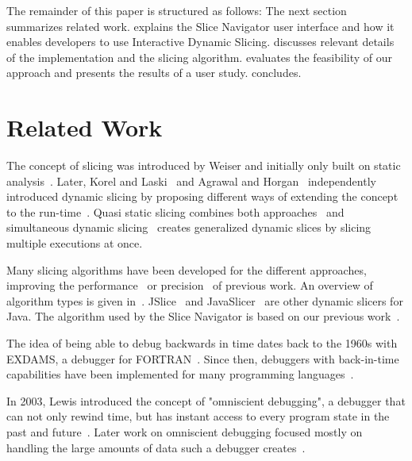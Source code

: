 \documentclass[
			english,
			review,
			]{elsarticle}
\begin{document}
The remainder of this paper is structured as follows:
The next section summarizes related work.
 explains the Slice Navigator user interface and how it enables developers to use Interactive Dynamic Slicing.
 discusses relevant details of the implementation and the slicing algorithm.
 evaluates the feasibility of our approach and presents the results of a user study.
 concludes.

\section{Related Work}

The concept of slicing was introduced by Weiser and initially only built on static analysis~\cite{weiser_programmers_1982, weiser_program_1981}.
Later, Korel and Laski~\cite{korel_dynamic_1990} and Agrawal and Horgan~\cite{agrawal_dynamic_1990} independently introduced dynamic slicing by proposing different ways of extending the concept to the run-time~\cite{binkley_theoretical_2006}.
Quasi static slicing combines both approaches~\cite{venkatesh_semantic_1991} and simultaneous dynamic slicing~\cite{hall_automatic_1995} creates generalized dynamic slices by slicing multiple executions at once.

Many slicing algorithms have been developed for the different approaches, improving the performance~\cite{reps_speeding_1994} or precision~\cite{kumar_better_2002, zhang_precise_2003} of previous work.
An overview of algorithm types is given in~\cite{korel_dynamic_1998}.
JSlice~\cite{wang_dynamic_2008} and JavaSlicer~\cite{hammacher_08_design_and_implementation} are other dynamic slicers for Java.
The algorithm used by the Slice Navigator is based on our previous work~\cite{treffer_dynamic_2014}.

The idea of being able to debug backwards in time dates back to the 1960s with EXDAMS, a debugger for FORTRAN~\cite{balzer_exdams_1969}.
Since then, debuggers with back-in-time capabilities have been implemented for many programming languages~\cite{feldman_igor_1988, agrawal_debugging_1993, lieberman_zstep_1997, hofer_design_2006}.

In 2003, Lewis introduced the concept of "omniscient debugging", a debugger that can not only rewind time, but has instant access to every program state in the past and future~\cite{lewis_debugging_2003}.
Later work on omniscient debugging focused mostly on handling the large amounts of data such a debugger creates~\cite{pothier_scalable_2007, lienhard_practical_2008}.
\end{document}
